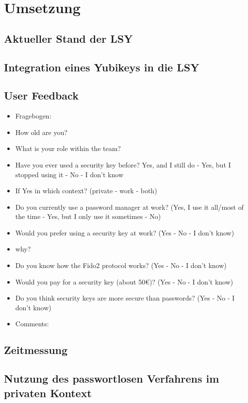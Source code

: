 \chapter{Umsetzung}

\section{Aktueller Stand der LSY}

\section{Integration eines Yubikeys in die LSY}

\section{User Feedback}
\begin{itemize}
    \item Fragebogen:
    \item How old are you?
    \item What is your role within the team?
    \item Have you ever used a security key before? Yes, and I still do - Yes, but I stopped using it - No - I don't know
    \item If Yes in which context? (private - work - both)
    \item Do you currently use a password manager at work? (Yes, I use it all/most of the time - Yes, but I only use it sometimes - No)
    \item Would you prefer using a security key at work? (Yes - No - I don't know)
    \item why?
    \item Do you know how the Fido2 protocol works? (Yes - No - I don't know)
    \item Would you pay for a security key (about 50€)? (Yes - No - I don't know)
    \item Do you think security keys are more secure than passwords? (Yes - No - I don't know)
    \item Comments:
\end{itemize}

\section{Zeitmessung}

\section{Nutzung des passwortlosen Verfahrens im privaten Kontext}